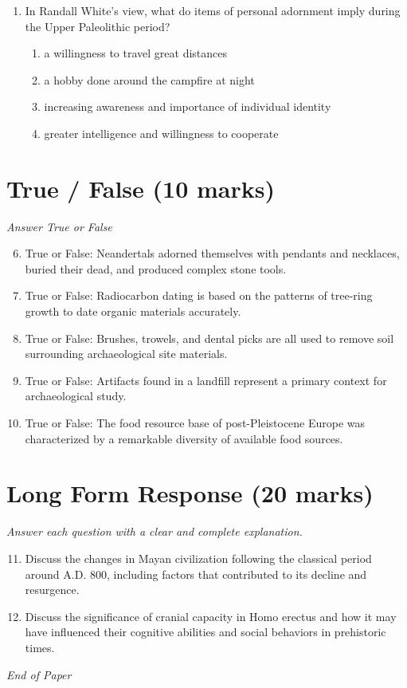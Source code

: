 \documentclass[12pt]{article}
\begin{document}
\begin{enumerate}[label=\arabic*.]
\begin{enumerate}[label=(\alph*)]
    \item Erectus possessed a larger brain.
    \item Erectus was a relatively short-lived species.
\end{enumerate}
\item In Randall White's view, what do items of personal adornment imply during the Upper Paleolithic period?
\begin{enumerate}[label=(\alph*)]
    \item a willingness to travel great distances
    \item a hobby done around the campfire at night
    \item increasing awareness and importance of individual identity
    \item greater intelligence and willingness to cooperate
\end{enumerate}
\end{enumerate}

\section*{True / False (10 marks)}
\textit{Answer True or False}
\begin{enumerate}[label=\arabic*.]
\setcounter{enumi}{5}
\item True or False: Neandertals adorned themselves with pendants and necklaces, buried their dead, and produced complex stone tools.
\item True or False: Radiocarbon dating is based on the patterns of tree-ring growth to date organic materials accurately.
\item True or False: Brushes, trowels, and dental picks are all used to remove soil surrounding archaeological site materials.
\item True or False: Artifacts found in a landfill represent a primary context for archaeological study.
\item True or False: The food resource base of post-Pleistocene Europe was characterized by a remarkable diversity of available food sources.
\end{enumerate}

\section*{Long Form Response (20 marks)}
\textit{Answer each question with a clear and complete explanation.}
\begin{enumerate}[label=\arabic*.]
\setcounter{enumi}{10}
\item Discuss the changes in Mayan civilization following the classical period around A.D. 800, including factors that contributed to its decline and resurgence.
\item Discuss the significance of cranial capacity in Homo erectus and how it may have influenced their cognitive abilities and social behaviors in prehistoric times.
\end{enumerate}

\vfill
\noindent\textit{End of Paper}
\end{document}
